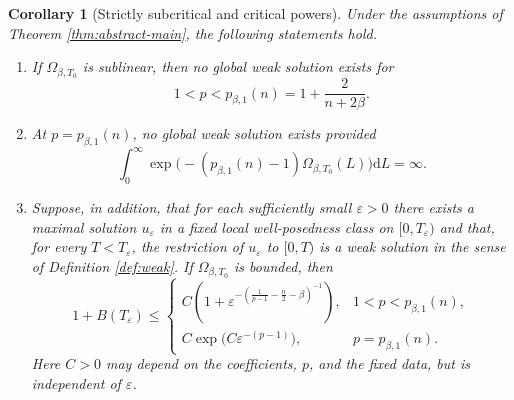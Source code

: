 \documentclass[11pt,reqno]{amsart}
\newtheorem{corollary}[theorem]{Corollary}
\theoremstyle{definition}
\theoremstyle{remark}
\begin{document}
	\begin{corollary}[Strictly subcritical and critical powers]
		\label{cor:ranges}
		Under the assumptions of Theorem \ref{thm:abstract-main}, the following statements hold.
		\begin{enumerate}
			\item If $\Omega_{\beta,T_0}$ is sublinear, then no global weak solution exists for
			$$
			1<p<p_{\beta,1}(n)=1+\frac{2}{n+2\beta}.
			$$
			\item At $p=p_{\beta,1}(n)$, no global weak solution exists provided
			\begin{equation}
				\label{eq:critical-osgood}
				\int_0^\infty
				\exp\bigl(-(p_{\beta,1}(n)-1)\Omega_{\beta,T_0}(L)\bigr)\mathrm{d}L
				=\infty.
			\end{equation}
			\item Suppose, in addition, that for each sufficiently small $\varepsilon>0$ there exists a maximal solution $u_\varepsilon$ in a fixed local well-posedness class on $[0,T_\varepsilon)$ and that, for every $T<T_\varepsilon$, the restriction of $u_\varepsilon$ to $[0,T)$ is a weak solution in the sense of Definition \ref{def:weak}. If $\Omega_{\beta,T_0}$ is bounded, then
			\begin{equation}
				\label{eq:lifespan}
				1+B(T_\varepsilon)
				\leq
				\begin{cases}
					C\left(1+\varepsilon^{-\left(\frac{1}{p-1}-\frac{n}{2}-\beta\right)^{-1}}\right),
					&1<p<p_{\beta,1}(n),\\[1.2ex]
					C\exp\bigl(C\varepsilon^{-(p-1)}\bigr),
					&p=p_{\beta,1}(n).
				\end{cases}
			\end{equation}
			Here $C>0$ may depend on the coefficients, $p$, and the fixed data, but
			is independent of $\varepsilon$.
		\end{enumerate}
	\end{corollary}
	
\end{document}
